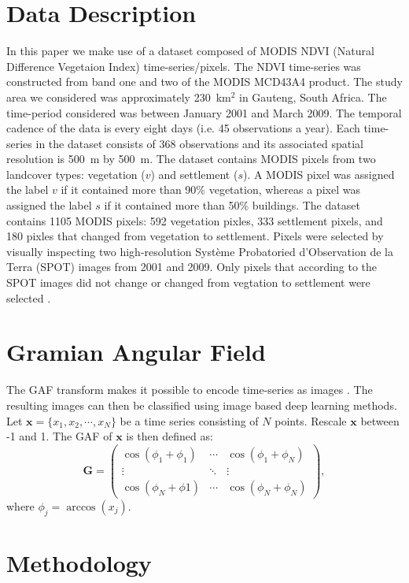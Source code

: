 \documentclass{article}
\begin{document}
\section{Data Description}
\label{sec:data}
In this paper we make use of a dataset composed of MODIS NDVI (Natural Difference Vegetaion Index) time-series/pixels. The NDVI time-series was constructed from band one and two of the MODIS MCD43A4 product. The study area we considered was approximately 230~km$^2$ in Gauteng, South Africa. The time-period considered was between January 2001 and March 2009. The temporal cadence of the data is every eight days (i.e. 45 observations a year). Each time-series in the dataset consists of 368 observations and its associated spatial resolution is 500~m by 500~m. The dataset contains MODIS pixels from two landcover types: vegetation ($v$) and settlement ($s$). A MODIS pixel was assigned the label $v$ if it contained more than 90\% vegetation, whereas a pixel was assigned the label $s$ if it contained more than 50\% buildings. The dataset contains 1105 MODIS pixels: 592 vegetation pixles, 333 settlement pixels, and 180 pixles that changed from vegetation to settlement. Pixels were selected by visually inspecting two high-resolution Syst\`{e}me Probatoried d'Observation de la Terra (SPOT) images from 2001 and 2009. Only pixels that according to the SPOT images did not change or changed from vegtation to settlement were selected \cite{grobler2013}.

\section{Gramian Angular Field}
\label{sec:GAF}
The GAF transform makes it possible to encode time-series as images \cite{wang2015}. The resulting images can then be classified using image based deep learning methods. Let $\mathbf{x} = \{x_1,x_2,\cdots,x_N\}$ be a time series consisting of $N$ points. Rescale $\mathbf{x}$ between -1 and 1. The GAF of $\mathbf{x}$ is then defined as: 
\begin{equation}
\mathbf{G} = \begin{pmatrix}
\cos(\phi_1+\phi_1) & \cdots & \cos(\phi_1+\phi_N)\\
\vdots& \ddots &\vdots\\
\cos(\phi_N+\phi1)&\cdots&\cos(\phi_N+\phi_N)
\end{pmatrix},\nonumber
\end{equation}
where $\phi_j = \arccos(x_j)$.
  
\section{Methodology}
\label{sec:exp}
\end{document}
